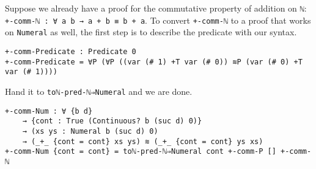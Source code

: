 \documentclass[\main/thesis.tex]{subfiles}
\begin{document}
Suppose we already have a proof for the commutative property of addition
on \lstinline|ℕ|: \lstinline|+-comm-ℕ : ∀ a b → a + b ≡ b + a|.
To convert \lstinline|+-comm-ℕ| to a proof that works on \lstinline|Numeral| as
well, the first step is to describe the predicate with our syntax.

\begin{lstlisting}[basicstyle=\ttfamily\scriptsize]
+-comm-Predicate : Predicate 0
+-comm-Predicate = ∀P (∀P ((var (# 1) +T var (# 0)) ≋P (var (# 0) +T var (# 1))))
\end{lstlisting}

Hand it to \lstinline|toℕ-pred-ℕ⇒Numeral| and we are done.

\begin{lstlisting}[basicstyle=\ttfamily\scriptsize]
+-comm-Num : ∀ {b d}
    → {cont : True (Continuous? b (suc d) 0)}
    → (xs ys : Numeral b (suc d) 0)
    → (_+_ {cont = cont} xs ys) ≋ (_+_ {cont = cont} ys xs)
+-comm-Num {cont = cont} = toℕ-pred-ℕ⇒Numeral cont +-comm-P [] +-comm-ℕ
\end{lstlisting}

\end{document}
